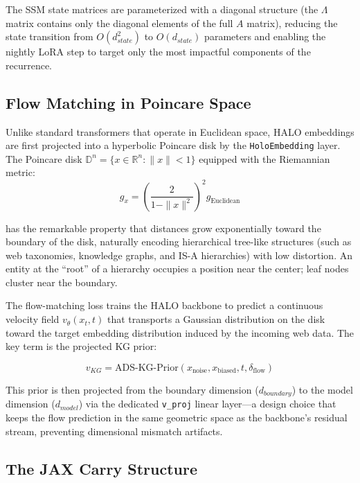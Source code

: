 The SSM state matrices are parameterized with a diagonal structure (the $\Lambda$ matrix contains only the diagonal elements of the full $A$ matrix), reducing the state transition from $O(d_{state}^2)$ to $O(d_{state})$ parameters and enabling the nightly LoRA step to target only the most impactful components of the recurrence.

\subsection{Flow Matching in Poincare Space}

Unlike standard transformers that operate in Euclidean space, HALO embeddings are first projected into a hyperbolic Poincare disk by the \texttt{HoloEmbedding} layer. The Poincare disk $\mathbb{D}^n = \{x \in \mathbb{R}^n : \|x\| < 1\}$ equipped with the Riemannian metric:
\begin{equation}
g_x = \left(\frac{2}{1 - \|x\|^2}\right)^2 g_{\text{Euclidean}}
\end{equation}

has the remarkable property that distances grow exponentially toward the boundary of the disk, naturally encoding hierarchical tree-like structures (such as web taxonomies, knowledge graphs, and IS-A hierarchies) with low distortion. An entity at the ``root'' of a hierarchy occupies a position near the center; leaf nodes cluster near the boundary.

The flow-matching loss trains the HALO backbone to predict a continuous velocity field $v_\theta(x_t, t)$ that transports a Gaussian distribution on the disk toward the target embedding distribution induced by the incoming web data. The key term is the projected KG prior:

\begin{equation}
v_{KG} = \text{ADS-KG-Prior}(x_{\text{noise}}, x_{\text{biased}}, t, \delta_{\text{flow}})
\end{equation}

This prior is then projected from the boundary dimension ($d_{boundary}$) to the model dimension ($d_{model}$) via the dedicated \texttt{v\_proj} linear layer---a design choice that keeps the flow prediction in the same geometric space as the backbone's residual stream, preventing dimensional mismatch artifacts.

\subsection{The JAX Carry Structure}

